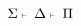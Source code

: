 \documentclass{standalone}
\begin{document}
\Huge
\vspace*{3in}$\displaystyle\Sigma\ \scriptscriptstyle \kern-0.1em\vdash\ \kern-0.1em\displaystyle \Delta\ \scriptscriptstyle \kern-0.1em\vdash\ \kern-0.1em\displaystyle \Pi$
\vspace*{3in}
\end{document}
